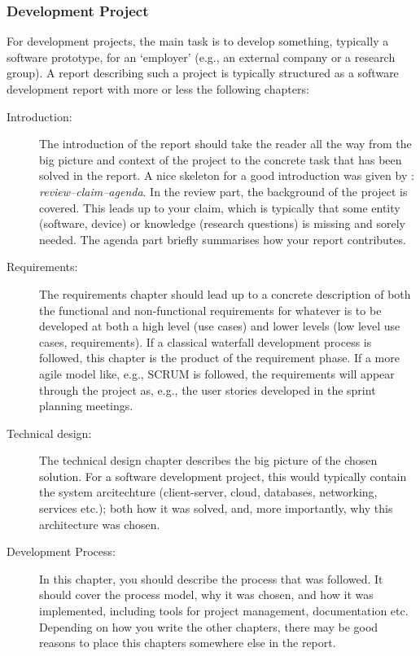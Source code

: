 \subsubsection{Development Project}
\label{sec:development}

For development projects, the main task is to develop something, typically a software prototype, for an `employer' (e.g., an external company or a research group). A report describing such a project is typically structured as a software development report with more or less the following chapters:

\begin{description}
    \item[Introduction:] The introduction of the report should take the reader all the way from the big picture and context of the project to the concrete task that has been solved in the report. A nice skeleton for a good introduction was given by \textcite{claerbout1991scrutiny}: \emph{review–claim–agenda}. In the review part, the background of the project is covered. This leads up to your claim, which is typically that some entity (software, device) or knowledge (research questions) is missing and sorely needed. The agenda part briefly summarises how your report contributes.
    \item[Requirements:] The requirements chapter should lead up to a concrete description of both the functional and non-functional requirements for whatever is to be developed at both a high level (use cases) and lower levels (low level use cases, requirements). If a classical waterfall development process is followed, this chapter is the product of the requirement phase. If a more agile model like, e.g., SCRUM is followed, the requirements will appear through the project as, e.g., the user stories developed in the sprint planning meetings.
    \item[Technical design:] The technical design chapter describes the big picture of the chosen solution. For a software development project, this would typically contain the system arcitechture (client-server, cloud, databases, networking, services etc.); both how it was solved, and, more importantly, why this architecture was chosen.
    \item[Development Process:] In this chapter, you should describe the process that was followed. It should cover the process model, why it was chosen, and how it was implemented, including tools for project management, documentation etc. Depending on how you write the other chapters, there may be good reasons to place this chapters somewhere else in the report.

\end{description}
